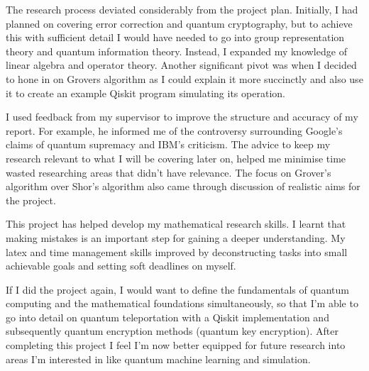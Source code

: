 \noindent The research process deviated considerably from the project plan. Initially, I had planned on covering error correction and quantum cryptography, but to achieve this with sufficient detail I would have needed to go into group representation theory and quantum information theory. Instead, I expanded my knowledge of linear algebra and operator theory. Another significant pivot was when I decided to hone in on Grovers algorithm as I could explain it more succinctly and also use it to create an example Qiskit program simulating its operation.

\noindent I used feedback from my supervisor to improve the structure and accuracy of my report. For example, he informed me of the controversy surrounding Google's claims of quantum supremacy and IBM's criticism. The advice to keep my research relevant to what I will be covering later on, helped me minimise time wasted researching areas that didn't have relevance. The focus on Grover's algorithm over Shor's algorithm also came through discussion of realistic aims for the project.

\noindent This project has helped develop my mathematical research skills. I learnt that making mistakes is an important step for gaining a deeper understanding. My latex and time management skills improved by deconstructing tasks into small achievable goals and setting soft deadlines on myself.

\noindent If I did the project again, I would want to define the fundamentals of quantum computing and the mathematical foundations simultaneously, so that I'm able to go into detail on quantum teleportation with a Qiskit implementation and subsequently quantum encryption methods (quantum key encryption). After completing this project I feel I'm now better equipped for future research into areas I'm interested in like quantum machine learning and simulation.
